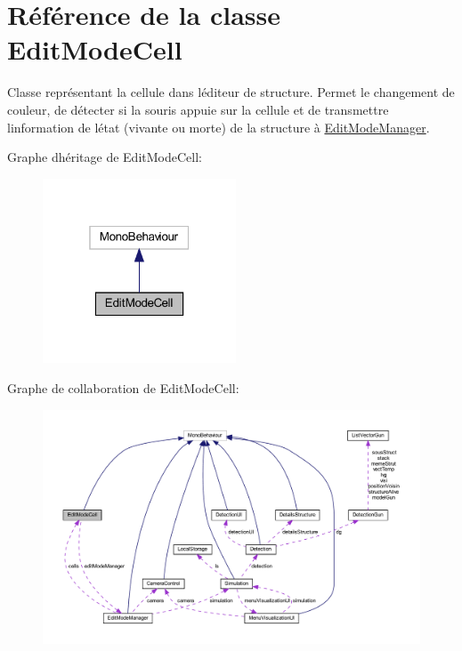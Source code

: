 \hypertarget{class_edit_mode_cell}{}\section{Référence de la classe Edit\+Mode\+Cell}
\label{class_edit_mode_cell}


Classe représentant la cellule dans l\textquotesingle{}éditeur de structure. Permet le changement de couleur, de détecter si la souris appuie sur la cellule et de transmettre l\textquotesingle{}information de l\textquotesingle{}état (vivante ou morte) de la structure à \mbox{\hyperlink{class_edit_mode_manager}{Edit\+Mode\+Manager}}.  




Graphe d\textquotesingle{}héritage de Edit\+Mode\+Cell\+:\nopagebreak
\begin{figure}[H]
\begin{center}
\leavevmode
\includegraphics[width=163pt]{class_edit_mode_cell__inherit__graph}
\end{center}
\end{figure}


Graphe de collaboration de Edit\+Mode\+Cell\+:
\nopagebreak
\begin{figure}[H]
\begin{center}
\leavevmode
\includegraphics[width=350pt]{class_edit_mode_cell__coll__graph}
\end{center}
\end{figure}
